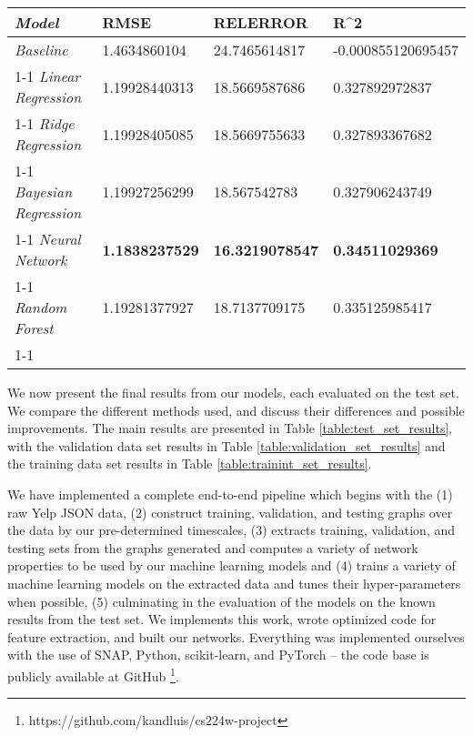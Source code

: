 \documentclass[letterpaper, 10 pt, conference]{ieeeconf}  %
\begin{document}
{\renewcommand{\arraystretch}{2}%
\begin{table*}[t]
\centering
\caption{Supervised Training Results on Test Set}
\label{table:test_set_results}
\begin{tabular}{|l|lll}
\hline
\textit{\textbf{Model}}      & \multicolumn{1}{l|}{\textbf{RMSE}} & \multicolumn{1}{l|}{\textbf{RELERROR}} & \multicolumn{1}{l|}{\textbf{R\textasciicircum 2}} \\ \hline
\textit{Baseline}            & 1.4634860104                       & 24.7465614817                          & -0.000855120695457                                \\ \cline{1-1}
\textit{Linear Regression}   & 1.19928440313                      & 18.5669587686                          & 0.327892972837                                    \\ \cline{1-1}
\textit{Ridge Regression}    & 1.19928405085                      & 18.5669755633                          & 0.327893367682                                    \\ \cline{1-1}
\textit{Bayesian Regression} & 1.19927256299                      & 18.567542783                           & 0.327906243749                                    \\ \cline{1-1}
\textit{Neural Network}      & \textbf{1.1838237529}              & \textbf{16.3219078547}                 & \textbf{0.34511029369}                            \\ \cline{1-1}
\textit{Random Forest}       & 1.19281377927                      & 18.7137709175                          & 0.335125985417                                    \\ \cline{1-1}
\end{tabular}
\end{table*}
}

We now present the final results from our models, each evaluated on the test set. We compare the different methods used, and discuss their differences and possible improvements. The main results are presented in Table \ref{table:test_set_results}, with the validation data set results in Table \ref{table:validation_set_results} and the training data set results in Table \ref{table:trainint_set_results}. 

We have implemented a complete end-to-end pipeline which begins with the (1) raw Yelp JSON data, (2) construct training, validation, and testing graphs over the data by our pre-determined timescales, (3) extracts training, validation, and testing sets from the graphs generated and computes a variety of network properties to be used by our machine learning models and (4) trains a variety of machine learning models on the extracted data and tunes their hyper-parameters when possible, (5) culminating in the evaluation of the models on the known results from the test set. We implements this work, wrote optimized code for feature extraction, and built our networks. Everything was implemented ourselves with the use of SNAP, Python, scikit-learn, and PyTorch -- the code base is publicly available at GitHub \footnote{https://github.com/kandluis/cs224w-project}.
\end{document}

